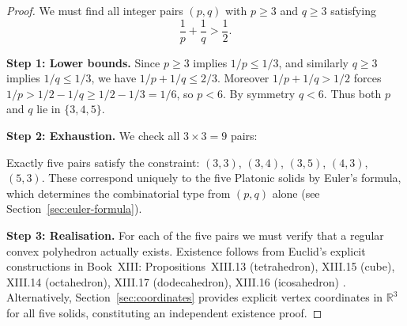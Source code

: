 \begin{proof}
We must find all integer pairs $(p,q)$ with $p \geq 3$ and $q \geq 3$ satisfying
\begin{equation}
  \frac{1}{p} + \frac{1}{q} > \frac{1}{2}.
  \label{eq:schlafli-constraint-proof}
\end{equation}

\medskip
\noindent\textbf{Step 1: Lower bounds.}
Since $p \geq 3$ implies $1/p \leq 1/3$, and similarly $q \geq 3$ implies
$1/q \leq 1/3$, we have $1/p + 1/q \leq 2/3$.  Moreover $1/p + 1/q > 1/2$
forces $1/p > 1/2 - 1/q \geq 1/2 - 1/3 = 1/6$, so $p < 6$.  By symmetry
$q < 6$.  Thus both $p$ and $q$ lie in $\{3,4,5\}$.

\medskip
\noindent\textbf{Step 2: Exhaustion.}
We check all $3 \times 3 = 9$ pairs:
\begin{center}
\end{center}
Exactly five pairs satisfy the constraint: $(3,3)$, $(3,4)$, $(3,5)$, $(4,3)$,
$(5,3)$.  These correspond uniquely to the five Platonic solids by
Euler's formula, which determines the combinatorial type from $(p,q)$ alone
(see Section~\ref{sec:euler-formula}).

\medskip
\noindent\textbf{Step 3: Realisation.}
For each of the five pairs we must verify that a regular convex polyhedron
actually exists.  Existence follows from Euclid's explicit constructions in
Book~XIII: Propositions~XIII.13 (tetrahedron), XIII.15 (cube), XIII.14
(octahedron), XIII.17 (dodecahedron), XIII.16 (icosahedron)
\cite{euclid_elements}.  Alternatively, Section~\ref{sec:coordinates}
provides explicit vertex coordinates in $\mathbb{R}^{3}$ for all five
solids, constituting an independent existence proof.


\end{proof}
